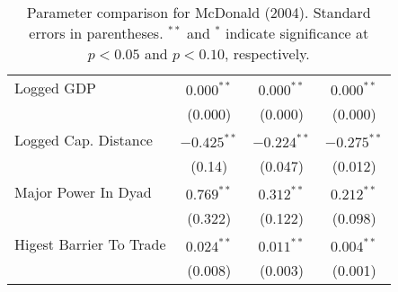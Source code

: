 \begin{table}[ht]
\begin{tabular}{lccc}
  Logged GDP & $0.000^{\ast\ast}$ & $0.000^{\ast\ast}$ & $0.000^{\ast\ast}$ \\ 
   & (0.000) & (0.000) & (0.000) \\ 
  Logged Cap. Distance & $-0.425^{\ast\ast}$ & $-0.224^{\ast\ast}$ & $-0.275^{\ast\ast}$ \\ 
   & (0.14) & (0.047) & (0.012) \\ 
  Major Power In Dyad & $0.769^{\ast\ast}$ & $0.312^{\ast\ast}$ & $0.212^{\ast\ast}$ \\ 
   & (0.322) & (0.122) & (0.098) \\ 
  Higest Barrier To Trade & $0.024^{\ast\ast}$ & $0.011^{\ast\ast}$ & $0.004^{\ast\ast}$ \\ 
   & (0.008) & (0.003) & (0.001) \\ 
   \hline
\hline
\end{tabular}
\endgroup
\caption{Parameter comparison for McDonald (2004). Standard errors in parentheses. $^{**}$ and $^{*}$ indicate significance at $p<0.05$ and $p<0.10$, respectively.} 
\label{tab:mcdonald_coef}
\end{table}

